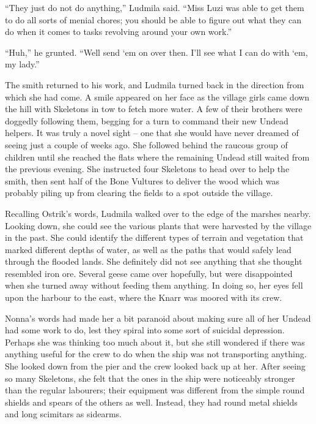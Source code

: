  

“They just do not do anything,” Ludmila said. “Miss Luzi was able to get them to do all sorts of menial chores; you should be able to figure out what they can do when it comes to tasks revolving around your own work.”

 

“Huh,” he grunted. “Well send ‘em on over then. I’ll see what I can do with ‘em, my lady.”

 

The smith returned to his work, and Ludmila turned back in the direction from which she had come. A smile appeared on her face as the village girls came down the hill with Skeletons in tow to fetch more water. A few of their brothers were doggedly following them, begging for a turn to command their new Undead helpers. It was truly a novel sight – one that she would have never dreamed of seeing just a couple of weeks ago. She followed behind the raucous group of children until she reached the flats where the remaining Undead still waited from the previous evening. She instructed four Skeletons to head over to help the smith, then sent half of the Bone Vultures to deliver the wood which was probably piling up from clearing the fields to a spot outside the village.

 

Recalling Ostrik’s words, Ludmila walked over to the edge of the marshes nearby. Looking down, she could see the various plants that were harvested by the village in the past. She could identify the different types of terrain and vegetation that marked different depths of water, as well as the paths that would safely lead through the flooded lands. She definitely did not see anything that she thought resembled iron ore. Several geese came over hopefully, but were disappointed when she turned away without feeding them anything. In doing so, her eyes fell upon the harbour to the east, where the Knarr was moored with its crew.

 

Nonna’s words had made her a bit paranoid about making sure all of her Undead had some work to do, lest they spiral into some sort of suicidal depression. Perhaps she was thinking too much about it, but she still wondered if there was anything useful for the crew to do when the ship was not transporting anything. She looked down from the pier and the crew looked back up at her. After seeing so many Skeletons, she felt that the ones in the ship were noticeably stronger than the regular labourers; their equipment was different from the simple round shields and spears of the others as well. Instead, they had round metal shields and long scimitars as sidearms.

